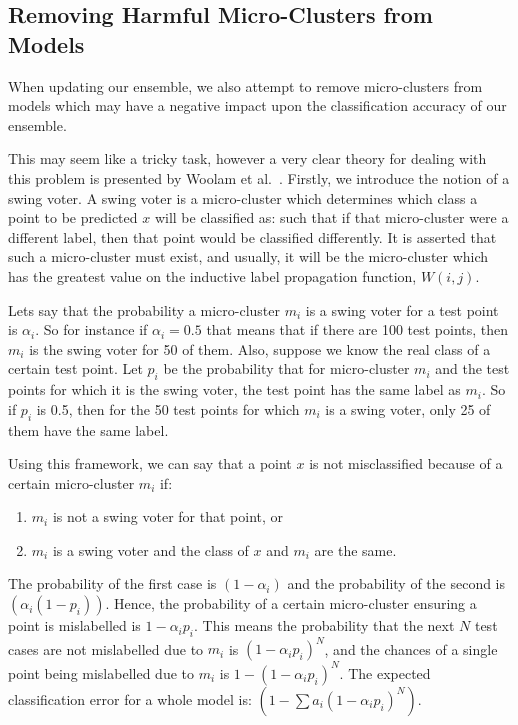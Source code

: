 \documentclass[12pt,a4paper,oneside]{report}
\begin{document}
\subsection*{Removing Harmful Micro-Clusters from Models}

When updating our ensemble, we also attempt to remove micro-clusters from models which may have a negative impact upon the classification accuracy of our ensemble. 

This may seem like a tricky task, however a very clear theory for dealing with this problem is presented by Woolam et al.~\cite{LabStr}. Firstly, we introduce the notion of a swing voter. A swing voter is a micro-cluster which determines which class a point to be predicted $x$ will be classified as: such that if that micro-cluster were a different label, then that point would be classified differently. It is asserted that such a micro-cluster must exist, and usually, it will be the micro-cluster which has the greatest value on the inductive label propagation function, $W(i,j)$.

Lets say that the probability a micro-cluster $m_i$ is a swing voter for a test point is $\alpha_i$. So for instance if $\alpha_i = 0.5$ that means that if there are 100 test points, then $m_i$ is the swing voter for 50 of them. Also, suppose we know the real class of a certain test point. Let $p_i$ be the probability that for micro-cluster $m_i$ and the test points for which it is the swing voter, the test point has the same label as $m_i$. So if $p_i$ is 0.5, then for the 50 test points for which $m_i$ is a swing voter, only 25 of them have the same label. 

Using this framework, we can say that a point $x$ is not misclassified because of a certain micro-cluster $m_i$ if:
\begin{enumerate}
\item $m_i$ is not a swing voter for that point, or
\item $m_i$ is a swing voter and the class of $x$ and $m_i$ are the same.
\end{enumerate}

The probability of the first case is $(1-\alpha_i)$ and the probability of the second is $(\alpha_i(1-p_i))$. Hence, the probability of a certain micro-cluster ensuring a point is mislabelled is $1-\alpha_ip_i$. This means the probability that the next $N$ test cases are not mislabelled due to $m_i$ is $(1-\alpha_ip_i)^N$, and the chances of a single point being mislabelled due to $m_i$ is $1-(1-\alpha_ip_i)^N$. The expected classification error for a whole model is: $(1-\sum a_i(1-\alpha_ip_i)^N)$.
\end{document}
